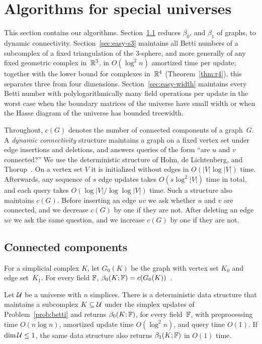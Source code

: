 \section{Algorithms for special universes}\label{sec:easy}

This section contains our algorithms.
Section~\ref{sec:easy-conn} reduces $\beta_0$, and $\beta_1$ of graphs, to dynamic connectivity.
Section~\ref{sec:easy-s3} maintains all Betti numbers of a subcomplex of a fixed triangulation of the $3$-sphere, and more generally of any fixed geometric complex in~$\mathbb{R}^3$, in $O(\log^2 n)$ amortized time per update; together with the lower bound for complexes in~$\mathbb{R}^4$ (Theorem~\ref{thm:r4}), this separates three from four dimensions.
Section~\ref{sec:easy-width} maintains every Betti number with polylogarithmically many field operations per update in the worst case when the boundary matrices of the universe have small width or when the Hasse diagram of the universe has bounded treewidth.

Throughout, $c(G)$ denotes the number of connected components of a graph~$G$.
A \emph{dynamic connectivity} structure maintains a graph on a fixed vertex set under edge insertions and deletions, and answers queries of the form ``are $u$ and $v$ connected?''
We use the deterministic structure of Holm, de Lichtenberg, and Thorup~\cite{HDT01}.
On a vertex set $V$ it is initialized without edges in $O(|V|\log|V|)$ time.
Afterwards, any sequence of $s$ edge updates takes $O(s\log^2|V|)$ time in total, and each query takes $O(\log|V|/\log\log|V|)$ time.
Such a structure also maintains $c(G)$.
Before inserting an edge $uv$ we ask whether $u$ and $v$ are connected, and we decrease $c(G)$ by one if they are not.
After deleting an edge $uv$ we ask the same question, and we increase $c(G)$ by one if they are not.

\subsection{Connected components}\label{sec:easy-conn}

For a simplicial complex $K$, let $G_0(K)$ be the graph with vertex set $K_0$ and edge set~$K_1$.
For every field $\mathbb{F}$, $\beta_0(K;\mathbb{F})=c(G_0(K))$~\cite{Mun84}.

\begin{proposition}\label{prop:beta0}
Let $\mathcal{U}$ be a universe with $n$ simplices.
There is a deterministic data structure that maintains a subcomplex $K\subseteq\mathcal{U}$ under the simplex updates of Problem~\ref{prob:betti} and returns $\beta_0(K;\mathbb{F})$, for every field~$\mathbb{F}$, with preprocessing time $O(n\log n)$, amortized update time $O(\log^2 n)$, and query time $O(1)$.
If $\dim\mathcal{U}\le1$, the same data structure also returns $\beta_1(K;\mathbb{F})$ in $O(1)$ time.
\end{proposition}

